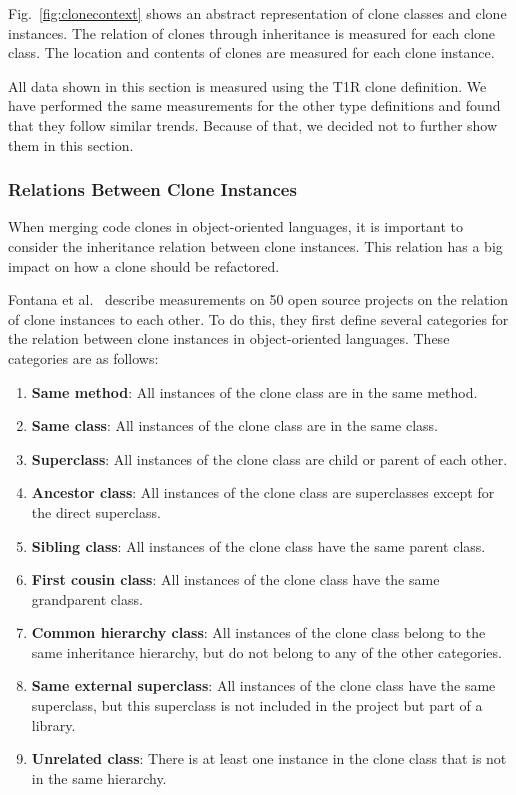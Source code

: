 \documentclass[a4paper]{article}
\begin{document}
Fig.~\ref{fig:clonecontext} shows an abstract representation of clone classes and clone instances. The relation of clones through inheritance is measured for each clone class. The location and contents of clones are measured for each clone instance.

All data shown in this section is measured using the T1R clone definition. We have performed the same measurements for the other type definitions and found that they follow similar trends. Because of that, we decided not to further show them in this section.

\subsubsection{Relations Between Clone Instances} \label{chap:relationsinstances}
When merging code clones in object-oriented languages, it is important to consider the inheritance relation between clone instances. This relation has a big impact on how a clone should be refactored.

Fontana et al.~\cite{fontana2015duplicated} describe measurements on 50 open source projects on the relation of clone instances to each other. To do this, they first define several categories for the relation between clone instances in object-oriented languages. These categories are as follows:
\begin{enumerate}
  \item \textbf{Same method}: All instances of the clone class are in the same method.
  \item \textbf{Same class}: All instances of the clone class are in the same class.
  \item \textbf{Superclass}: All instances of the clone class are child or parent of each other.
  \item \textbf{Ancestor class}: All instances of the clone class are superclasses except for the direct superclass.
  \item \textbf{Sibling class}: All instances of the clone class have the same parent class.
  \item \textbf{First cousin class}: All instances of the clone class have the same grandparent class.
\item \textbf{Common hierarchy class}: All instances of the clone class belong to the same inheritance hierarchy, but do not belong to any of the other categories.
\item \textbf{Same external superclass}: All instances of the clone class have the same superclass, but this superclass is not included in the project but part of a library.
\item \textbf{Unrelated class}: There is at least one instance in the clone class that is not in the same hierarchy.
\end{enumerate}
\end{document}
